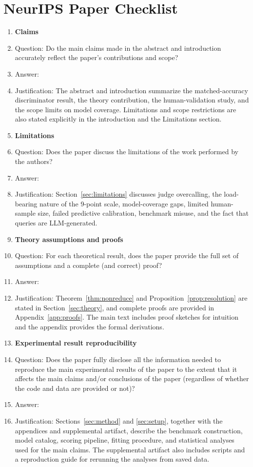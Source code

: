\section*{NeurIPS Paper Checklist}

\begin{enumerate}

\item {\bf Claims}
    \item[] Question: Do the main claims made in the abstract and introduction accurately reflect the paper's contributions and scope?
    \item[] Answer: \answerYes{}
    \item[] Justification: The abstract and introduction summarize the matched-accuracy discriminator result, the theory contribution, the human-validation study, and the scope limits on model coverage. Limitations and scope restrictions are also stated explicitly in the introduction and the Limitations section.

\item {\bf Limitations}
    \item[] Question: Does the paper discuss the limitations of the work performed by the authors?
    \item[] Answer: \answerYes{}
    \item[] Justification: Section~\ref{sec:limitations} discusses judge overcalling, the load-bearing nature of the 9-point scale, model-coverage gaps, limited human-sample size, failed predictive calibration, benchmark misuse, and the fact that queries are LLM-generated.

\item {\bf Theory assumptions and proofs}
    \item[] Question: For each theoretical result, does the paper provide the full set of assumptions and a complete (and correct) proof?
    \item[] Answer: \answerYes{}
    \item[] Justification: Theorem~\ref{thm:nonreduce} and Proposition~\ref{prop:resolution} are stated in Section~\ref{sec:theory}, and complete proofs are provided in Appendix~\ref{app:proofs}. The main text includes proof sketches for intuition and the appendix provides the formal derivations.

\item {\bf Experimental result reproducibility}
    \item[] Question: Does the paper fully disclose all the information needed to reproduce the main experimental results of the paper to the extent that it affects the main claims and/or conclusions of the paper (regardless of whether the code and data are provided or not)?
    \item[] Answer: \answerYes{}
    \item[] Justification: Sections~\ref{sec:method} and \ref{sec:setup}, together with the appendices and supplemental artifact, describe the benchmark construction, model catalog, scoring pipeline, fitting procedure, and statistical analyses used for the main claims. The supplemental artifact also includes scripts and a reproduction guide for rerunning the analyses from saved data.


\end{enumerate}
